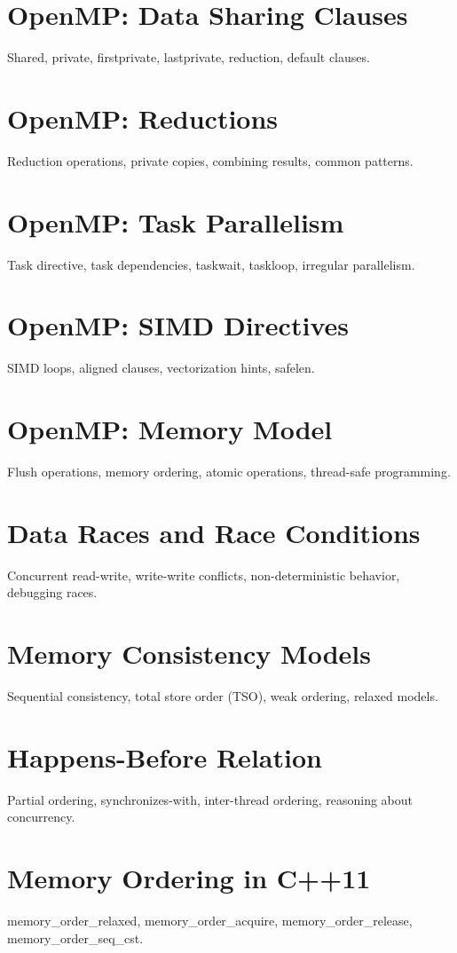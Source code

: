 \chapter{OpenMP: Data Sharing Clauses}
Shared, private, firstprivate, lastprivate, reduction, default clauses.

\chapter{OpenMP: Reductions}
Reduction operations, private copies, combining results, common patterns.

\chapter{OpenMP: Task Parallelism}
Task directive, task dependencies, taskwait, taskloop, irregular parallelism.

\chapter{OpenMP: SIMD Directives}
SIMD loops, aligned clauses, vectorization hints, safelen.

\chapter{OpenMP: Memory Model}
Flush operations, memory ordering, atomic operations, thread-safe programming.

\chapter{Data Races and Race Conditions}
Concurrent read-write, write-write conflicts, non-deterministic behavior, debugging races.

\chapter{Memory Consistency Models}
Sequential consistency, total store order (TSO), weak ordering, relaxed models.

\chapter{Happens-Before Relation}
Partial ordering, synchronizes-with, inter-thread ordering, reasoning about concurrency.

\chapter{Memory Ordering in C++11}
memory\_order\_relaxed, memory\_order\_acquire, memory\_order\_release, memory\_order\_seq\_cst.

